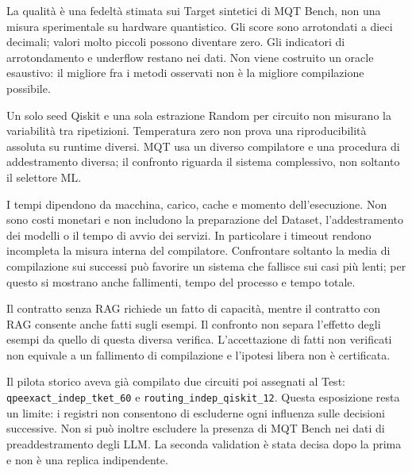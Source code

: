 La qualità è una fedeltà stimata sui Target sintetici di MQT Bench, non una
misura sperimentale su hardware quantistico. Gli score sono arrotondati a dieci
decimali; valori molto piccoli possono diventare zero. Gli indicatori di
arrotondamento e underflow restano nei dati. Non viene costruito un oracle
esaustivo: il migliore fra i metodi osservati non è la migliore compilazione
possibile.

Un solo seed Qiskit e una sola estrazione Random per circuito non misurano la
variabilità tra ripetizioni. Temperatura zero non prova una riproducibilità
assoluta su runtime diversi. MQT usa un diverso compilatore e
una procedura di addestramento diversa; il confronto riguarda il sistema
complessivo, non soltanto il selettore ML.

I tempi dipendono da macchina, carico, cache e momento dell'esecuzione. Non sono
costi monetari e non includono la preparazione del Dataset, l'addestramento dei
modelli o il tempo di avvio dei servizi. In particolare i timeout rendono
incompleta la misura interna del compilatore. Confrontare soltanto la media di
compilazione sui successi può favorire un sistema che fallisce sui casi più
lenti; per questo si mostrano anche fallimenti, tempo del processo e tempo totale.

Il contratto senza RAG richiede un fatto di capacità, mentre il contratto con RAG
consente anche fatti sugli esempi. Il confronto non separa l'effetto degli esempi
da quello di questa diversa verifica. L'accettazione di fatti non verificati
non equivale a un fallimento di compilazione e l'ipotesi libera non è certificata.

Il pilota storico aveva già compilato due circuiti poi assegnati al Test:
\texttt{qpeexact\_indep\_tket\_60} e \texttt{routing\_indep\_qiskit\_12}.
Questa esposizione resta un limite: i registri non consentono di escluderne ogni
influenza sulle decisioni successive. Non si può inoltre escludere la presenza
di MQT Bench nei dati di preaddestramento degli LLM. La seconda validation è
stata decisa dopo la prima e non è una replica indipendente.

